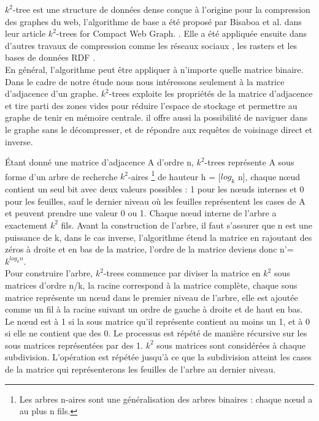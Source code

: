 $k^2$-tree est une structure de données dense conçue à l'origine pour la compression des graphes du web, l'algorithme de base a été proposé par Bisaboa et al. dans leur article $k^2$-trees for Compact Web Graph. \citep{brisaboa2009k}. Elle a été appliquée ensuite dans d'autres travaux de compression comme les réseaux sociaux \citep{shi2012optimizing}, les rasters \citep{de2013compact} et les bases de données RDF \citep{alvarez2017succinct}.\\

  
En général, l'algorithme peut être appliquer à n'importe quelle matrice binaire. Dans le cadre de notre étude nous nous intéressons seulement à la matrice d'adjacence d'un graphe.
$k^2$-trees exploite les propriétés de la matrice d'adjacence et tire parti des zones vides pour réduire l'espace de stockage et permettre au graphe de tenir en mémoire centrale. il offre aussi la possibilité de naviguer dans le graphe sans le décompresser, et de répondre aux requêtes de voisinage direct et inverse.

Étant donné une matrice d'adjacence A d'ordre n, $k^2$-trees représente A sous forme d'un arbre de recherche $k^2$-aires \footnote{Les arbres n-aires sont une généralisation des arbres binaires : chaque nœud a au plus n fils.} de hauteur h = [$log_{k}$ n], chaque nœud contient un seul bit avec deux valeurs possibles : 1 pour les nœuds internes et 0 pour les feuilles, sauf le dernier niveau où les feuilles représentent les cases de A et peuvent prendre une valeur 0 ou 1. Chaque nœud interne de l'arbre a exactement $k^2$ fils.  
Avant la construction de l'arbre, il faut s'assurer que n est une puissance de k, dans le cas inverse, l'algorithme étend la matrice en rajoutant des zéros à droite et en bas de la matrice, l'ordre de la matrice deviens donc n'= $k^{log_{k} n}$.\\

Pour construire l'arbre, $k^2$-trees commence par diviser la matrice en $k^{2}$ sous matrices d'ordre n/k, la racine correspond à la matrice complète, chaque sous matrice représente un nœud dans le premier niveau de l'arbre, elle est ajoutée comme un fil à la racine suivant un ordre de gauche à droite et de haut en bas. Le nœud est à 1 si la sous matrice qu'il représente contient au moins un 1, et à 0 si elle ne contient que des 0. Le processus est répété de manière récursive sur les sous matrices représentées par des 1. $k^{2}$ sous matrices sont considérées à chaque subdivision. L'opération est répétée jusqu'à ce que la subdivision atteint les cases de la matrice qui représenterons les feuilles de l'arbre au dernier niveau. 

